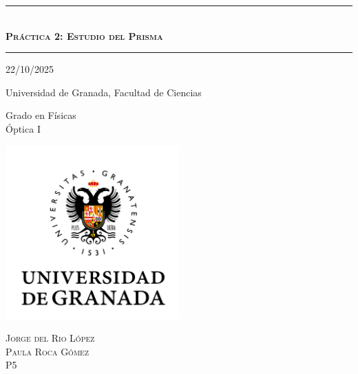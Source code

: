 \documentclass[10pt,onecolumn]{article}
\begin{document}
\renewcommand{\headrulewidth}{0.5pt}
\newcommand{\HRule}[1]{\rule{\linewidth}{#1}}
\renewcommand{\refname}{Bibliography}
\renewcommand{\tablename}{Table}
\renewcommand{\contentsname}{Index}
\renewcommand{\figurename}{Fig.}

\onecolumn
\begin{titlepage}
\centering
    {\HRule{2 pt}} \\
    \vspace{0.5cm}
    {\scshape\Huge {\textbf{Práctica 2: Estudio del Prisma}  }}  \\
    \vspace{1 mm}
    
    {\HRule{2 pt}}

    \vspace{1cm}
    \Large 22/10/2025 \\
    \vspace{1cm}
 
    \normalfont\Large Universidad de Granada, Facultad de Ciencias \\
    \vspace{0.5cm}
    
    
     \normalfont\Large Grado en Físicas \\
    \vspace{0.5cm}
     \normalfont Óptica I\\
    \vspace{1.5cm}

\centering
    {\includegraphics[width=0.5\textwidth]{UGR-MARCA-01-color.jpg}\par}

\vfill
    \vspace{1cm}
    \scshape\Large Jorge del Rio López \\
    \scshape\Large Paula Roca Gómez\\

    \vspace{0.5cm}
    \scshape\Large P5

\vfill

\end{titlepage}
\end{document}
